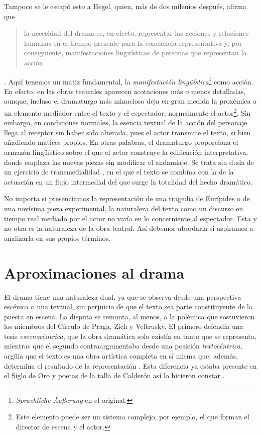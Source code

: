  Tampoco se le escapó esto a Hegel, quien, más de dos milenios después, afirma que \blockquote{la necesidad del drama es, en efecto, representar las acciones y relaciones humanas en el tiempo presente para la conciencia representativa y, por consiguiente,  manifestaciones lingüísticas de personas que representan la acción} \parencite*[3, C, III, \textsc{i}, a; traducción propia]{hegel2016}. Aquí tenemos un matiz fundamental, la \textit{manifestación lingüística}\footnote{\flushbottom\textit{Sprachliche Äußerung} en el original.} como acción. En efecto, en las obras teatrales aparecen acotaciones más o menos detalladas, aunque, incluso el dramaturgo más minucioso deja en gran medida la proxémica a un elemento mediador entre el texto y el espectador, normalmente el actor\footnote{Este elemento puede ser un sistema complejo, por ejemplo, el que forman el director de escena y el actor.}. Sin embargo, en condiciones normales, la esencia textual de la acción del personaje llega al receptor sin haber sido alterada, pues el actor transmite el texto, si bien añadiendo matices propios. En otras palabras, el dramaturgo proporciona el armazón lingüístico sobre el que el actor construye la edificación interpretativa, donde emplaza las nuevas piezas sin modificar el andamiaje. Se trata sin duda de un ejercicio de transmedialidad \parencite[181-182]{tuerschmann2013}, en el que el texto se combina con la de la actuación en un flujo intermedial del que surge la totalidad del hecho dramático.  

No importa si presenciamos la representación de una tragedia de Eurípides o de una novísima pieza experimental, la naturaleza del texto como un discurso en tiempo real mediado por el actor no varía en lo concerniente al espectador. Esta y no otra es la naturaleza de la obra teatral. Así debemos abordarla si aspiramos a analizarla en sus propios términos.

\section{Aproximaciones al drama}
El drama tiene una naturaleza dual, ya que se observa desde una perspectiva escénica o una textual, sin perjuicio de que el texto sea parte constituyente de la puesta en escena. La disputa se remonta, al menos, a la polémica que sostuvieron los miembros del Círculo de Praga, Zich y Veltrusky. El primero defendía una tesis \textit{escenocéntrica}, que la obra dramática solo existía en tanto que se representa, mientras que el segundo contraargumentaba desde una posición \textit{textocéntrica}, argüía que el texto es una obra artística completa en sí misma que, además, determina el resultado de la representación \parencite[612-613]{schaeffer1995}. Esta diferencia ya estaba presente en el Siglo de Oro y poetas de la talla de Calderón así lo hicieron constar \parencite[122]{ehrlicher2023}.

